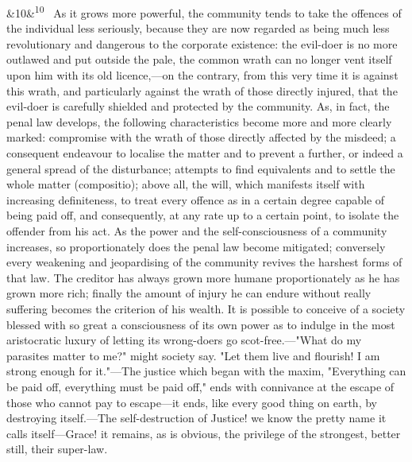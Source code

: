 \documentclass[12pt]{article}
\newcommand{\para}[1][]{\par\noindent\ifx&#1&\else\textsuperscript{\footnotesize #1}~\fi}
\begin{document}
\para[10] As it grows more powerful, the community tends to take the offences of the individual less seriously, because they are now regarded as being much less revolutionary and dangerous to the corporate existence: the evil-doer is no more outlawed and put outside the pale, the common wrath can no longer vent itself upon him with its old licence,---on the contrary, from this very time it is against this wrath, and particularly against the wrath of those directly injured, that the evil-doer is carefully shielded and protected by the community. As, in fact, the penal law develops, the following characteristics become more and more clearly marked: compromise with the wrath of those directly affected by the misdeed; a consequent endeavour to localise the matter and to prevent a further, or indeed a general spread of the disturbance; attempts to find equivalents and to settle the whole matter (compositio); above all, the will, which manifests itself with increasing definiteness, to treat every offence as in a certain degree capable of being paid off, and consequently, at any rate up to a certain point, to isolate the offender from his act. As the power and the self-consciousness of a community increases, so proportionately does the penal law become mitigated; conversely every weakening and jeopardising of the community revives the harshest forms of that law. The creditor has always grown more humane proportionately as he has grown more rich; finally the amount of injury he can endure without really suffering becomes the criterion of his wealth. It is possible to conceive of a society blessed with so great a consciousness of its own power as to indulge in the most aristocratic luxury of letting its wrong-doers go scot-free.---"What do my parasites matter to me?" might society say. "Let them live and flourish! I am strong enough for it."---The justice which began with the maxim, "Everything can be paid off, everything must be paid off," ends with connivance at the escape of those who cannot pay to escape---it ends, like every good thing on earth, by destroying itself.---The self-destruction of Justice! we know the pretty name it calls itself---Grace! it remains, as is obvious, the privilege of the strongest, better still, their super-law.
\end{document}
